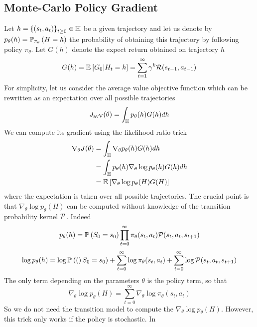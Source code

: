 \subsection{Monte-Carlo Policy Gradient}
Let $h = {\{(s_t, a_t)\}}_{t\geq 0} \in \H$ be a given trajectory and let us 
denote by $p_\theta(h) = \P[\pi_\theta]{H = h}$ the probability of obtaining 
this trajectory by following policy $\pi_\theta$. Let $G(h)$ denote the expect
return obtained on trajectory $h$
\begin{equation}
	G(h) = \E{G_0 | H_t = h} = \sum_{t=1}^\infty \gamma^k \calR(s_{t-1},
	a_{t-1}) 
\end{equation}
For simplicity, let us consider the average value objective function which can
be rewritten as an expectation over all possible trajectories
\begin{equation}
	J_{\text{avV}}(\theta) = \int_\H p_\theta(h) G(h) dh
\end{equation}
We can compute its gradient using the likelihood ratio trick 
\begin{equation}
	\begin{split}
		\nabla_\theta J(\theta) &= \int_\H \nabla_\theta p_\theta(h) G(h) dh\\
								&= \int_\H p_\theta(h)\nabla_\theta \log
									p_\theta(h)G(h)dh\\
								&= \E{\nabla_\theta \log p_\theta(H)G(H)}
	\end{split}
\end{equation}
where the expectation is taken over all possible trajectories. The crucial
point is that $\nabla_\theta \log p_\theta(H)$ can be computed without
knowledge of the transition probability kernel $\calP$. Indeed
\begin{equation*}
	p_\theta(h) = \P{S_0 = s_0} \prod_{t=0}^\infty \pi_\theta(s_t, a_t)
	\calP(s_t, a_t, s_{t+1})
\end{equation*}
\begin{equation*}
	\log p_\theta(h) = \log \P(S_0 = s_0) + \sum_{t=0}^\infty \log 
	\pi_\theta(s_t, a_t) + \sum_{t=0}^\infty \log \calP(s_t, a_t, s_{t+1})
\end{equation*}
The only term depending on the parameters $\theta$ is the policy term, so that
\begin{equation}
	\nabla_\theta \log p_\theta(H) = \sum_{t=0}^\infty \nabla_\theta \log 
	\pi_\theta(s_t, a_t)
\end{equation}
So we do not need the transition model to compute the $\nabla_\theta \log 
p_\theta(H)$. However, this trick only works if the policy is stochastic. In
